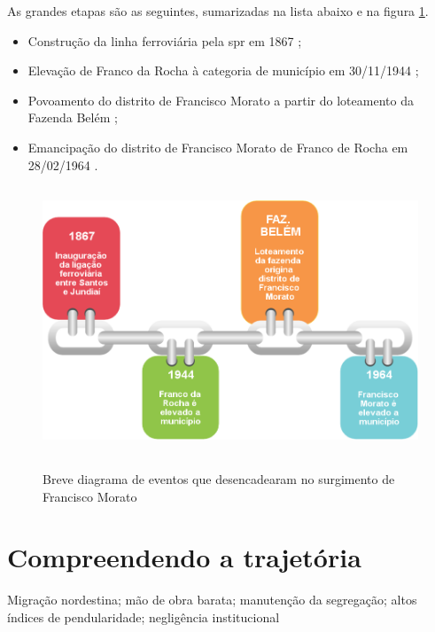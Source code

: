 	As grandes etapas são as seguintes, sumarizadas na lista abaixo e na figura \ref{fig:timeline}.
	
	\begin{itemize}
		\item Construção da linha ferroviária pela \gls{spr} em 1867 \cite[p.26]{ferreira2010a};
		\item Elevação de Franco da Rocha à categoria de município em 30/11/1944 \cite{ibge2018a};
		\item Povoamento do distrito de Francisco Morato a partir do loteamento da Fazenda Belém \cite[p.57]{cassiele2007a};
		\item Emancipação do distrito de Francisco Morato de Franco de Rocha em 28/02/1964 \cite[p.57]{cassiele2007a}.
	\end{itemize}
	
	\begin{figure}[H]
		\centering
		\caption[Diagrama do surgimento de Francisco Morato]{Breve diagrama de eventos que desencadearam no surgimento de Francisco Morato}
		\includegraphics[height=8cm]{img/linha_do_tempo}
		\label{fig:timeline}
	\end{figure}
	
	\section{Compreendendo a trajetória} \label{sec:balanco}
	
	Migração nordestina; mão de obra barata; manutenção da segregação; altos índices de pendularidade; negligência institucional
	
